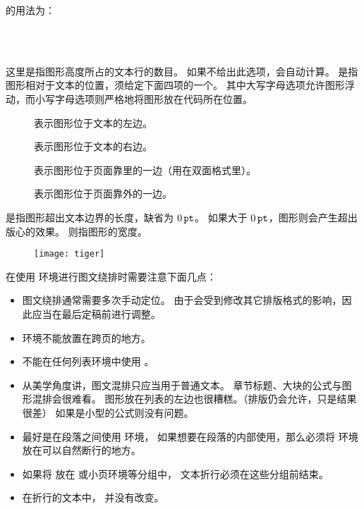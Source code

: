 的用法为：
\begin{flushleft}
	\\
	\qquad{}\\
\end{flushleft}

这里是指图形高度所占的文本行的数目。
如果不给出此选项，会自动计算。
是指图形相对于文本的位置，须给定下面四项的一个。
其中大写字母选项允许图形浮动，而小写字母选项则严格地将图形放在代码所在位置。
\begin{description}
	\item [] 表示图形位于文本的左边。
	\item [] 表示图形位于文本的右边。
	\item [] 表示图形位于页面靠里的一边（用在双面格式里）。
	\item [] 表示图形位于页面靠外的一边。
\end{description}
是指图形超出文本边界的长度，缺省为 $0\,\mathtt{pt}$。
如果大于 $0\,\mathtt{pt}$，图形则会产生超出版心的效果。
则指图形的宽度。

\begin{wrapfigure}{r}{4.5cm}
	\texttt{[image: tiger]}
\end{wrapfigure}
在使用  环境进行图文绕排时需要注意下面几点：
\begin{itemize}
	\item 图文绕排通常需要多次手动定位。
	由于会受到修改其它排版格式的影响，因此应当在最后定稿前进行调整。
	\item {} 环境不能放置在跨页的地方。
	\item 不能在任何列表环境中使用 。
	\item 从美学角度讲，图文混排只应当用于普通文本。
	章节标题、大块的公式与图形混排会很难看。
	图形放在列表的左边也很糟糕。（排版仍会允许，只是结果很差）
	如果是小型的公式则没有问题。
	\item 最好是在段落之间使用  环境，
	如果想要在段落的内部使用，那么必须将  环境放在可以自然断行的地方。
	\item 如果将  放在  或小页环境等分组中，
	文本折行必须在这些分组前结束。
	\item 在折行的文本中， 并没有改变。
\end{itemize}

